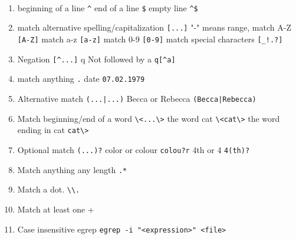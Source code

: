 \documentclass[12pt,a4paper]{report}
\begin{document}
\paragraph{\color{RoyalBlue}{RegEx}\\}
\begin{enumerate}
\item beginning of a line \colorbox{pagelm}{\color{Magenta}\lstinline+^+} end of a line \colorbox{pagelm}{\color{Magenta}\lstinline+$+}  empty line \colorbox{pagelm}{\color{Magenta}\lstinline+^$+}  \\
\item match alternative spelling/capitalization \colorbox{pagelm}{\color{Magenta}\lstinline+[...]+} "-" means range, match A-Z \colorbox{pagelm}{\color{Magenta}\lstinline+[A-Z]+}  match a-z \colorbox{pagelm}{\color{Magenta}\lstinline+[a-z]+}  match 0-9 \colorbox{pagelm}{\color{Magenta}\lstinline+[0-9]+}  match special characters \colorbox{pagelm}{\color{Magenta}\lstinline+[_!.?]+}  \\
\item Negation \colorbox{pagelm}{\color{Magenta}\lstinline+[^...]+}  q Not followed by a \colorbox{pagelm}{\color{Magenta}\lstinline+q[^a]+}  \\
\item match anything \colorbox{pagelm}{\color{Magenta}\lstinline+.+}  date \colorbox{pagelm}{\color{Magenta}\lstinline+07.02.1979+}  \\
\item Alternative match \colorbox{pagelm}{\color{Magenta}\lstinline+(...|...)+} Becca or Rebecca \colorbox{pagelm}{\color{Magenta}\lstinline+(Becca|Rebecca)+}  \\
\item Match beginning/end of a word \colorbox{pagelm}{\color{Magenta}\lstinline+\<...\>+}  the word cat \colorbox{pagelm}{\color{Magenta}\lstinline+\<cat\>+}  the word ending in cat \colorbox{pagelm}{\color{Magenta}\lstinline+cat\>+}  \\
\item Optional match \colorbox{pagelm}{\color{Magenta}\lstinline+(...)?+}  color or colour \colorbox{pagelm}{\color{Magenta}\lstinline+colou?r+}  4th or 4 \colorbox{pagelm}{\color{Magenta}\lstinline+4(th)?+} \\
\item Match anything any length \colorbox{pagelm}{\color{Magenta}\lstinline+.*+} \\
\item Match a dot. \colorbox{pagelm}{\color{Magenta}\lstinline|\\.|} \\
\item Match at least one \colorbox{pagelm}{\color{Magenta}\lstinline+++}   \\
\item Case insensitive egrep \colorbox{pagelm}{\color{Magenta}\lstinline+egrep -i "<expression>" <file>+} 
\end{enumerate}
\end{document}
